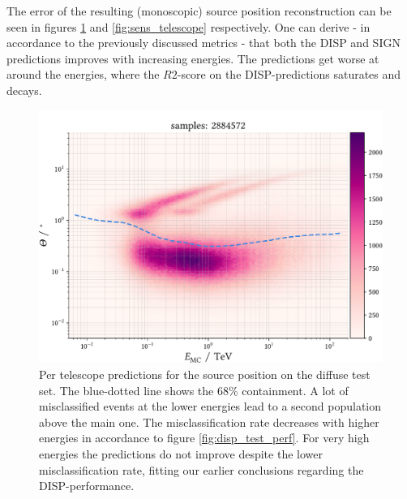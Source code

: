 The error of the resulting (monoscopic) source position reconstruction 
can be seen in figures \ref{fig:sens_telescope_test} and \ref{fig:sens_telescope}
respectively.
One can derive - in accordance to the previously discussed metrics - 
that both the DISP and SIGN predictions improves with increasing energies.
The predictions get worse at around the energies, where the $R2$-score
on the DISP-predictions saturates and decays.

\begin{figure}
    \centering
    \captionsetup{width=0.9\linewidth}
    \includegraphics[width=.9\textwidth]{../analysis/plots/test/tel_vs_energy.pdf}
    \caption{Per telescope predictions for the source position on the diffuse test set.
    The blue-dotted line shows the 68\% containment. 
    A lot of misclassified events at the lower energies
    lead to a second population above the main one.
    The misclassification rate decreases with higher energies 
    in accordance to figure \ref{fig:disp_test_perf}.
    For very high energies the predictions do not improve despite the lower 
    misclassification rate, fitting our earlier conclusions regarding the DISP-performance.}
    \label{fig:sens_telescope_test}
\end{figure}

